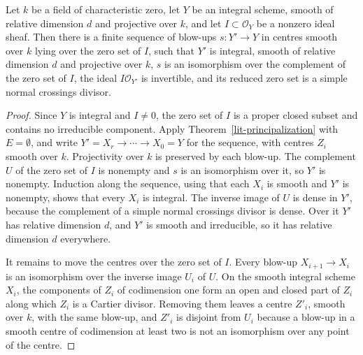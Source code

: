 \begin{corollary}\label{lit-principalization-projective}
Let $k$ be a field of characteristic zero, let $Y$ be an integral scheme,
smooth of relative dimension $d$ and projective over $k$, and let
$I\subset\mathcal O_Y$ be a nonzero ideal sheaf. Then there is a finite
sequence of blow-ups $s:Y'\to Y$ in centres smooth over $k$ lying over the
zero set of $I$, such that $Y'$ is integral, smooth of relative dimension $d$
and projective over $k$, $s$ is an isomorphism over the complement of the zero
set of $I$, the ideal $I\mathcal O_{Y'}$ is invertible, and its reduced zero
set is a simple normal crossings divisor.
\end{corollary}
\begin{proof}
Since $Y$ is integral and $I\neq0$, the zero set of $I$ is a proper closed
subset and contains no irreducible component. Apply
Theorem~\ref{lit-principalization} with $E=\emptyset$, and write
$Y'=X_r\to\cdots\to X_0=Y$ for the sequence, with centres $Z_i$ smooth over
$k$. Projectivity over $k$ is preserved by each blow-up. The complement $U$ of
the zero set of $I$ is nonempty and $s$ is an isomorphism over it, so $Y'$ is
nonempty. Induction along the sequence, using that each $X_i$ is smooth and
$Y'$ is nonempty, shows that every $X_i$ is integral. The inverse image of $U$
is dense in $Y'$, because the complement of a simple normal crossings divisor
is dense. Over it $Y'$ has relative dimension $d$, and $Y'$ is smooth and
irreducible, so it has relative dimension $d$ everywhere.

It remains to move the centres over the zero set of $I$. Every blow-up
$X_{i+1}\to X_i$ is an isomorphism over the inverse image $U_i$ of $U$. On the
smooth integral scheme $X_i$, the components of $Z_i$ of codimension one form
an open and closed part of $Z_i$ along which $Z_i$ is a Cartier divisor.
Removing them leaves a centre $Z'_i$, smooth over $k$, with the same blow-up,
and $Z'_i$ is disjoint from $U_i$ because a blow-up in a smooth centre of
codimension at least two is not an isomorphism over any point of the centre.
\end{proof}

